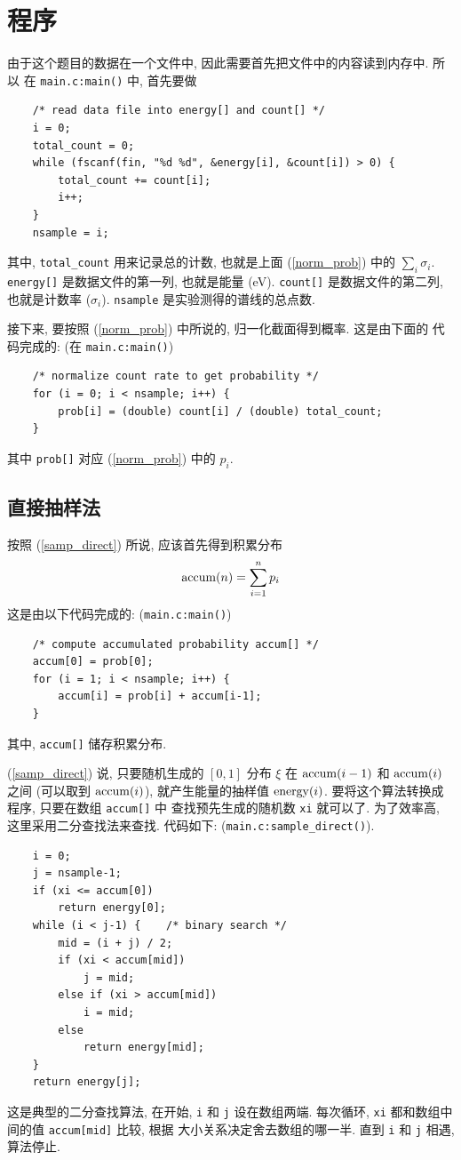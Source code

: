 \documentclass{ctexart}
\begin{document}
\section{程序}
由于这个题目的数据在一个文件中, 因此需要首先把文件中的内容读到内存中. 所以
在 \verb|main.c:main()| 中, 首先要做
\begin{verbatim}
    /* read data file into energy[] and count[] */
    i = 0;
    total_count = 0;
    while (fscanf(fin, "%d %d", &energy[i], &count[i]) > 0) {
        total_count += count[i];
        i++;
    }
    nsample = i;
\end{verbatim}
其中, \verb|total_count| 用来记录总的计数, 也就是上面 (\ref{norm_prob}) 中的
$\sum_i \sigma_i$. \verb|energy[]| 是数据文件的第一列, 也就是能量 (eV).
\verb|count[]| 是数据文件的第二列, 也就是计数率 ($\sigma_i$). \verb|nsample|
是实验测得的谱线的总点数.

接下来, 要按照 (\ref{norm_prob}) 中所说的, 归一化截面得到概率. 这是由下面的
代码完成的: (在 \verb|main.c:main()|)
\begin{verbatim}
    /* normalize count rate to get probability */
    for (i = 0; i < nsample; i++) {
        prob[i] = (double) count[i] / (double) total_count;
    }
\end{verbatim}
其中 \verb|prob[]| 对应 (\ref{norm_prob}) 中的 $p_i$.

\subsection{直接抽样法}
按照 (\ref{samp_direct}) 所说, 应该首先得到积累分布
\[
{\rm accum}(n) = \sum^n_{i = 1} p_i
\]
这是由以下代码完成的: (\verb|main.c:main()|)
\begin{verbatim}
    /* compute accumulated probability accum[] */
    accum[0] = prob[0];
    for (i = 1; i < nsample; i++) {
        accum[i] = prob[i] + accum[i-1];
    }
\end{verbatim}
其中, \verb|accum[]| 储存积累分布.

(\ref{samp_direct}) 说, 只要随机生成的 $[0,1]$ 分布 $\xi$ 在 ${\rm accum}(i-1)$
和 ${\rm accum}(i)$ 之间 (可以取到 ${\rm accum}(i)$), 就产生能量的抽样值
${\rm energy}(i)$. 要将这个算法转换成程序, 只要在数组 \verb|accum[]| 中
查找预先生成的随机数 \verb|xi| 就可以了. 为了效率高, 这里采用二分查找法来查找. 代码如下:
(\verb|main.c:sample_direct()|).
\begin{verbatim}
    i = 0;
    j = nsample-1;
    if (xi <= accum[0])
        return energy[0];
    while (i < j-1) {    /* binary search */
        mid = (i + j) / 2;
        if (xi < accum[mid])
            j = mid;
        else if (xi > accum[mid])
            i = mid;
        else
            return energy[mid];
    }
    return energy[j];
\end{verbatim}
这是典型的二分查找算法, 在开始, \verb|i| 和 \verb|j| 设在数组两端.
每次循环, \verb|xi| 都和数组中间的值 \verb|accum[mid]| 比较, 根据
大小关系决定舍去数组的哪一半. 直到 \verb|i| 和 \verb|j| 相遇, 算法停止.
\end{document}
